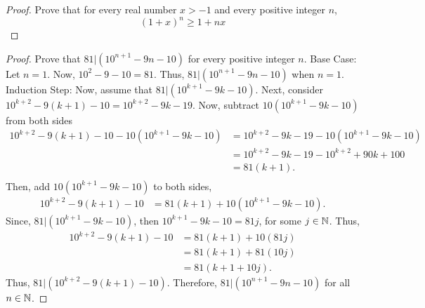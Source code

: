 \documentclass[12pt]{article}
\begin{document}
    \begin{proof}{Prove that for every real number \(x>-1\) and every positive integer \(n\), \begin{equation*}
        (1+x)^n\geq 1+nx
    \end{equation*}}
    
    \end{proof}
    \begin{proof}{Prove that \(81|(10^{n+1}-9n-10) \) for every positive integer \(n\).}
        Base Case: Let \(n=1\). Now, \(10^2-9 - 10 = 81\). Thus, \(81|(10^{n+1}-9n-10)\) when \(n=1\).\\
        Induction Step: Now, assume that \(81|(10^{k+1}-9k-10)\). Next, consider \(10^{k+2}-9(k+1)-10 = 10^{k+2} - 9k -19\). Now, subtract \(10(10^{k+1} -9k-10)\) from both sides
        \begin{equation*}
            \begin{split}
                10^{k+2}-9(k+1)-10 - 10(10^{k+1} -9k-10) &= 10^{k+2} - 9k -19 - 10(10^{k+1} -9k-10)\\
                &=10^{k+2} - 9k -19 - 10^{k+2} + 90k + 100\\
                &= 81(k+1).\\
            \end{split}
        \end{equation*}
        Then, add \(10(10^{k+1} -9k-10)\) to both sides,
        \begin{equation*}
            \begin{split}
                10^{k+2}-9(k+1)-10 &= 81(k+1) + 10(10^{k+1} -9k-10).
            \end{split}
        \end{equation*}
        Since, \(81|(10^{k+1}-9k-10)\), then \(10^{k+1}-9k-10=81j\), for some \(j\in\mathbb{N}\). Thus, 
        \begin{equation*}
            \begin{split}
                10^{k+2}-9(k+1)-10 &= 81(k+1) + 10(81j)\\
                &=81(k+1) + 81(10j)\\
                &=81(k+1+10j).
            \end{split}
        \end{equation*}
        Thus, \(81|(10^{k+2}-9(k+1)-10)\). Therefore, \(81|(10^{n+1}-9n-10) \) for all \(n\in\mathbb{N}\).
    \end{proof}
\end{document}
